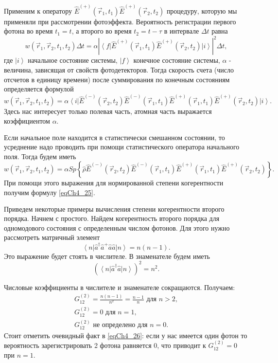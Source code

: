 Применим к оператору $\hat{E}^{(+)}\left(\vec{r}_1, t_1\right)\hat{E}^{(+)}\left(\vec{r}_2,
t_2\right)$ процедуру, которую мы применяли при рассмотрении
фотоэффекта. Вероятность регистрации первого фотона во время $t_1 =
t$, а второго во время $t_2 = t - \tau$ в интервале $\Delta t$ равна
\begin{equation}
w\left(\vec{r}_1, \vec{r}_2, t_1, t_2\right) \Delta t= 
\alpha \left| \left<f\right|
\hat{E}^{(+)}\left(\vec{r}_1, t_1\right)\hat{E}^{(+)}\left(\vec{r}_2,
t_2\right)
\left|i\right>\right|^2 \Delta t,
\nonumber
\end{equation}
где $\left|i\right>$ начальное состояние системы, $\left|f\right>$
конечное состояние системы, $\alpha$ - величина, зависящая от свойств
фотодетекторов. Тогда скорость счета (число отсчетов в единицу
времени) после суммирования по конечным состояниям определяется
формулой
\begin{equation}
w\left(\vec{r}_1, \vec{r}_2, t_1, t_2\right) = 
\alpha \left<i\right|
\hat{E}^{(-)}\left(\vec{r}_2, t_2\right)\hat{E}^{(-)}\left(\vec{r}_1,
t_1\right)
\hat{E}^{(+)}\left(\vec{r}_1, t_1\right)\hat{E}^{(+)}\left(\vec{r}_2,
t_2\right)
\left|i\right>.
\nonumber
\end{equation}
Здесь нас интересует только полевая часть, атомная часть выражается
коэффициентом $\alpha$.

Если начальное поле находится в статистически смешанном состоянии, то
усреднение надо проводить при помощи статистического оператора
начального поля. Тогда будем иметь
\begin{equation}
w\left(\vec{r}_1, \vec{r}_2, t_1, t_2\right) = 
\alpha Sp \left\{\hat{\rho}
\hat{E}^{(-)}\left(\vec{r}_2, t_2\right)\hat{E}^{(-)}\left(\vec{r}_1,
t_1\right)
\hat{E}^{(+)}\left(\vec{r}_1, t_1\right)\hat{E}^{(+)}\left(\vec{r}_2,
t_2\right)
\right\}.
\nonumber
\end{equation}
При помощи этого выражения для нормированной степени
когерентности получим формулу \eqref{eqCh4_25}.

Приведем некоторые примеры вычисления
степени когерентности второго порядка. Начнем с простого. Найдем
когерентность второго порядка для одномодового состояния с
определенным числом фотонов. Для этого нужно рассмотреть матричный
элемент  
\[
\left<n\right|\hat{a}^{\dag}\hat{a}^{+}\hat{a}\hat{a}\left|n\right> = n
\left(n - 1\right).
\]
Это выражение будет стоять в числителе. В знаменателе будем иметь 
\[
\left(\left<n\right|\hat{a}^{\dag}\hat{a}\left|n\right>\right)^2 = 
n^2.
\]

Числовые коэффициенты в числителе и знаменателе сокращаются. Получаем:
\begin{eqnarray}
G^{(2)}_{12} = \frac{n\left(n - 1\right)}{n^2} = \frac{n - 1}{n} 
\mbox{ для } n > 2,
\nonumber \\
G^{(2)}_{12} = 0
\mbox{ для } n = 1,
\nonumber \\
G^{(2)}_{12} 
\mbox{ не определено для } n = 0.
\label{eqCh4_26}
\end{eqnarray}
Стоит отметить очевидный факт в \eqref{eqCh4_26}: если у нас имеется
один фотон то вероятность зарегистрировать 2 фотона равняется 0, что
приводит к $G^{(2)}_{12} = 0$ при $n=1$.

